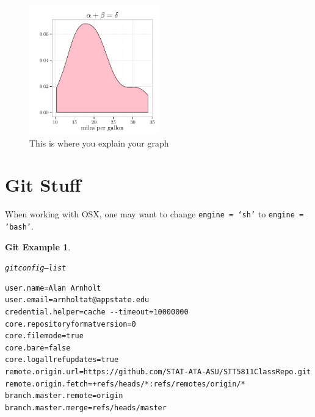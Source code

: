 \documentclass{article}\usepackage[]{graphicx}\usepackage[]{color}
\makeatletter
\newenvironment{kframe}{%
 \def\at@end@of@kframe{}%
 \ifinner\ifhmode%
  \def\at@end@of@kframe{\end{minipage}}%
  \begin{minipage}{\columnwidth}%
 \fi\fi%
 \def\FrameCommand##1{\hskip\@totalleftmargin \hskip-\fboxsep
 \colorbox{shadecolor}{##1}\hskip-\fboxsep
     \hskip-\linewidth \hskip-\@totalleftmargin \hskip\columnwidth}%
 \MakeFramed {\advance\hsize-\width
   \@totalleftmargin\z@ \linewidth\hsize
   \@setminipage}}%
 {\par\unskip\endMakeFramed%
 \at@end@of@kframe}
\newenvironment{knitrout}{}{} %
\theoremstyle{rcode}
\newtheorem{GIT}{Git Example}[section]
\makeatother
\begin{document}
\begin{figure}[h]
\begin{knitrout}
\color{fgcolor}

{\centering \includegraphics[width=0.5\textwidth]{figure/GraphShow-1} 

}



\end{knitrout}
\caption{This is where you explain your graph \label{graphDude}}
\end{figure}

\clearpage

\section{Git Stuff}

When working with OSX, one may want to change \texttt{engine = `sh'} to \texttt{engine = `bash'}.

\begin{knitrout}
\color{fgcolor}\begin{kframe}
\begin{GIT}\label{GITlabel}\hfill{}\begin{alltt}
git config --list
\end{alltt}

\begin{verbatim}
user.name=Alan Arnholt
user.email=arnholtat@appstate.edu
credential.helper=cache --timeout=10000000
core.repositoryformatversion=0
core.filemode=true
core.bare=false
core.logallrefupdates=true
remote.origin.url=https://github.com/STAT-ATA-ASU/STT5811ClassRepo.git
remote.origin.fetch=+refs/heads/*:refs/remotes/origin/*
branch.master.remote=origin
branch.master.merge=refs/heads/master
\end{verbatim}
\end{GIT}\end{kframe}
\end{knitrout}
\end{document}
